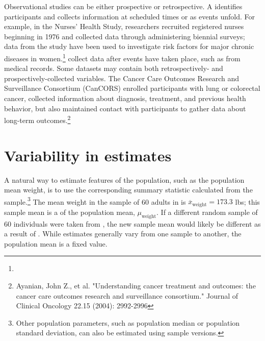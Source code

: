 Observational studies can be either prospective or retrospective. A  identifies participants and collects information at scheduled times or as events unfold. For example, in the Nurses' Health Study, researchers recruited registered nurses beginning in 1976 and collected data through administering biennial surveys; data from the study have been used to investigate risk factors for major chronic diseases in women.\footnote{\texttt{}}  collect data after events have taken place, such as from medical records. Some datasets may contain both retrospectively- and prospectively-collected variables. The Cancer Care Outcomes Research and Surveillance Consortium (CanCORS) enrolled participants with lung or colorectal cancer, collected information about diagnosis, treatment, and previous health behavior, but also maintained contact with participants to gather data about long-term outcomes.\footnote{Ayanian, John Z., et al. "Understanding cancer treatment and outcomes: the cancer care outcomes research and surveillance consortium." Journal of Clinical Oncology 22.15 (2004): 2992-2996}  


\section[Variability in estimates]{Variability in estimates} %
\label{variabilityInEstimates}


A natural way to estimate features of the population, such as the population mean weight, is to use the corresponding summary statistic calculated from the sample.\footnote{Other population parameters, such as population median or population standard deviation, can also be estimated using sample versions.} The mean weight in the sample of 60 adults in  is $\overline{x}_{\text{weight}} = 173.3$ lbs; this sample mean is a  of the population mean, $\mu_{\text{weight}}$. If a different random sample of 60 individuals were taken from , the new sample mean would likely be different as a result of . While estimates generally vary from one sample to another, the population mean is a fixed value.  

